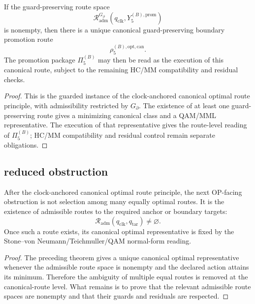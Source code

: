 \begin{proposition}
\label{prop:v410r10-boundary-route-principle-op5b}
If the guard-preserving route space
\[
 \mathcal R_{\mathrm{adm}}^{G_{\partial}}
 (q_{\mathrm{clk}},Y_{5}^{(B),\mathrm{prom}})
\]
is nonempty, then there is a unique canonical guard-preserving boundary
promotion route
\[
 \rho_{5}^{(B),\mathrm{opt,can}}.
\]
The promotion package \(\Pi_{5}^{(B)}\) may then be read as the execution of
this canonical route, subject to the remaining HC/MM compatibility and residual
checks.
\end{proposition}

\begin{proof}
This is the guarded instance of the clock-anchored canonical optimal route
principle, with admissibility restricted by \(G_{\partial}\). The existence of
at least one guard-preserving route gives a minimizing canonical class and a
QAM/MML representative. The execution of that representative gives the
route-level reading of \(\Pi_{5}^{(B)}\); HC/MM compatibility and residual
control remain separate obligations.
\end{proof}

\subsection{reduced obstruction}
\label{subsec:v410r10-reduced-obstruction}

\begin{theorem}
\label{thm:v410r10-op-facing-reduction}
After the clock-anchored canonical optimal route principle, the next OP-facing
obstruction is not selection among many equally optimal routes. It is the
existence of admissible routes to the required anchor or boundary targets:
\[
 \mathcal R_{\mathrm{adm}}(q_{\mathrm{clk}},q_{\mathrm{tar}})\neq\varnothing.
\]
Once such a route exists, its canonical optimal representative is fixed by the
Stone--von Neumann/Teichmuller/QAM normal-form reading.
\end{theorem}

\begin{proof}
The preceding theorem gives a unique canonical optimal representative whenever
the admissible route space is nonempty and the declared action attains its
minimum. Therefore the ambiguity of multiple equal routes is removed at the
canonical-route level. What remains is to prove that the relevant admissible
route spaces are nonempty and that their guards and residuals are respected.
\end{proof}

